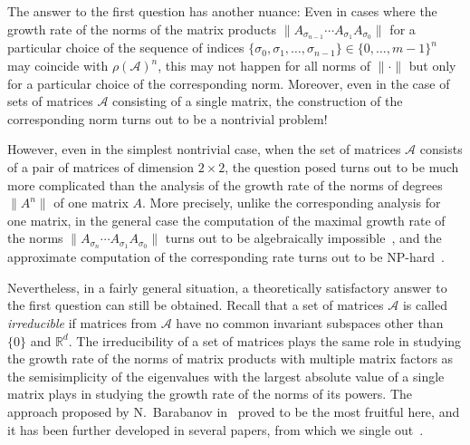 \documentclass[a4paper,10pt,reqno]{amsart}
\let\cite\citep
\newcommand{\setA}{\mathscr{A}}
\begin{document}
The answer to the first question has another nuance: Even in cases where the
growth rate of the norms of the matrix products $\|A_{\sigma_{n-1}}\cdots
A_{\sigma_{1}}A_{\sigma_{0}}\|$ for a particular choice of the sequence of
indices
$\{\sigma_{0},\sigma_{1},\ldots,\sigma_{n-1}\}\in{\{0,\ldots,m-1\}}^{n}$ may
coincide with ${\rho(\setA)}^{n}$, this may not happen for all norms of
$\|\cdot\|$ but only for a particular choice of the corresponding norm.
Moreover, even in the case of sets of matrices $\setA$ consisting of a single
matrix, the construction of the corresponding norm turns out to be a
nontrivial problem!

However, even in the simplest nontrivial case, when the set of matrices
$\setA$ consists of a pair of matrices of dimension ${2\times2}$, the
question posed turns out to be much more complicated than the analysis of the
growth rate of the norms of degrees $\|A^{n}\|$ of one matrix $A$. More
precisely, unlike the corresponding analysis for one matrix, in the general
case the computation of the maximal growth rate of the norms
$\|A_{\sigma_{n}}\cdots A_{\sigma_{1}}A_{\sigma_{0}}\|$ turns out to be
algebraically impossible~\cite{Koz:AiT90:6:e, Koz:AiT03:9:e, Koz:ArXiv13},
and the approximate computation of the corresponding rate turns out to be
NP-hard~\cite{TB:MCSS97-1, BT:Autom00}.

Nevertheless, in a fairly general situation, a theoretically satisfactory
answer to the first question can still be obtained. Recall that a set of
matrices $\setA$ is called \emph{irreducible} if matrices from $\setA$ have
no common invariant subspaces other than $\{0\}$ and ${\mathbb{R}}^{d}$. The
irreducibility of a set of matrices plays the same role in studying the
growth rate of the norms of matrix products with multiple matrix factors as
the semisimplicity of the eigenvalues with the largest absolute value of a
single matrix plays in studying the growth rate of the norms of its powers.
The approach proposed by N.~Barabanov in~\cite{Bar:AIT88-2:e, Bar:AIT88-3:e,
Bar:AIT88-5:e} proved to be the most fruitful here, and it has been further
developed in several papers, from which we single out~\cite{Wirth:LAA02}.
\end{document}
